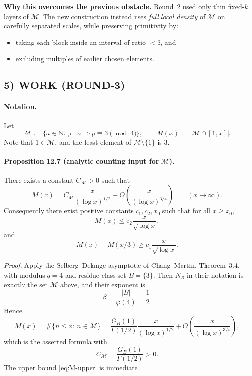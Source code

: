 \textbf{Why this overcomes the previous obstacle.}
Round~2 used only thin fixed-$k$ layers of $\mathcal M$. The new construction instead uses \emph{full local density} of $\mathcal M$ on carefully separated scales, while preserving primitivity by:
\begin{itemize}
\item taking each block inside an interval of ratio $<3$, and
\item excluding multiples of earlier chosen elements.
\end{itemize}

\subsection*{5) WORK (ROUND-3)}

\paragraph{\textbf{Notation.}}
Let
\[
\mathcal M:=\{n\in\mathbb N:\ p\mid n\Longrightarrow p\equiv 3\pmod 4\},
\qquad
M(x):=|\mathcal M\cap[1,x]|.
\]
Note that $1\in \mathcal M$, and the least element of $\mathcal M\setminus\{1\}$ is $3$.

\bigskip

\paragraph{\textbf{Proposition 12.7 (analytic counting input for $\mathcal M$).}}
There exists a constant $C_{\mathcal M}>0$ such that
\[
M(x)=C_{\mathcal M}\frac{x}{(\log x)^{1/2}}+O\!\left(\frac{x}{(\log x)^{3/4}}\right)
\qquad (x\to\infty).
\]
Consequently there exist positive constants $c_1,c_2,x_0$ such that for all $x\ge x_0$,
\begin{equation}
\label{eq:M-upper}
M(x)\le c_2\frac{x}{\sqrt{\log x}},
\end{equation}
and
\begin{equation}
\label{eq:M-interval}
M(x)-M(x/3)\ge c_1\frac{x}{\sqrt{\log x}}.
\end{equation}

\emph{Proof.}
Apply the Selberg--Delange asymptotic of Chang--Martin, Theorem~3.4, with modulus $q=4$ and residue class set $B=\{3\}$.
Then $N_B$ in their notation is exactly the set $\mathcal M$ above, and their exponent is
\[
\beta=\frac{|B|}{\varphi(4)}=\frac12.
\]
Hence
\[
M(x)=\#\{n\le x:\ n\in\mathcal M\}
=
\frac{G_B(1)}{\Gamma(1/2)}\frac{x}{(\log x)^{1/2}}
+O\!\left(\frac{x}{(\log x)^{3/4}}\right),
\]
which is the asserted formula with
\[
C_{\mathcal M}=\frac{G_B(1)}{\Gamma(1/2)}>0.
\]
The upper bound \eqref{eq:M-upper} is immediate.

